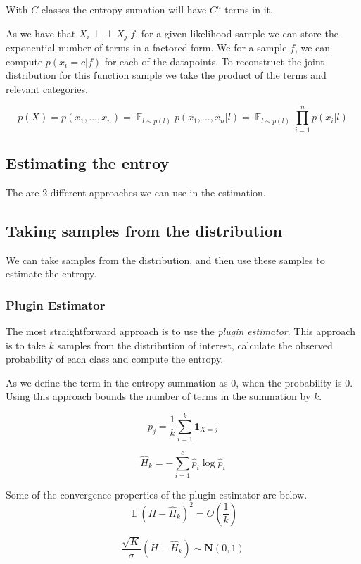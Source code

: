 \documentclass[12pt, a4paper]{report}
\theoremstyle{definition}
\DeclareMathOperator{\E}{\mathbb{E}}
\begin{document}
With $C$ classes the entropy sumation will have $C^n$ terms in it. 

As we have that $ X_i \perp\!\!\!\perp X_j | f$, for a given likelihood sample we can store the exponential number of terms in a factored form. We for a sample $f$, we can compute $p(x_i = c | f)$ for each of the datapoints. To reconstruct the joint distribution for this function sample we take the product of the terms and relevant categories.


$$ p(X) = p(x_1, \ldots, x_n) = \E_{l \sim p(l)}  p(x_1, \ldots, x_n | l) = \E_{l \sim p(l)} \prod_{i=1}^n  p(x_i| l)$$

\subsection{Estimating the entroy}

The are 2 different approaches we can use in the estimation.

\subsection{Taking samples from the distribution}

We can take samples from the distribution, and then use these samples to estimate the entropy.



\subsubsection{Plugin Estimator}
The most straightforward approach is to use the \textit{plugin estimator}. This approach is to take $k$ samples from the distribution of interest, calculate the observed probability of each class and compute the entropy.

As we define the term in the entropy summation as $0$, when the probability is $0$. Using this approach bounds the number of terms in the summation by $k$.

$$p_j = \frac{1}{k} \sum_{i=1}^k \mathbf{1}_{X = j} $$

$$\hat{H}_k = - \sum_{i=1}^{c} \hat{p}_i \log{\hat{p}_i}$$


Some of the convergence properties of the plugin estimator are below.
$$\E \left(H - \hat{H}_k \right)^2 = O \left ( \frac{1}{k} \right) $$

$$ \frac{\sqrt{K}}{\sigma} \left(H - \hat{H}_k \right) \sim \mathbf{N} \left(0, 1 \right) $$
\end{document}
